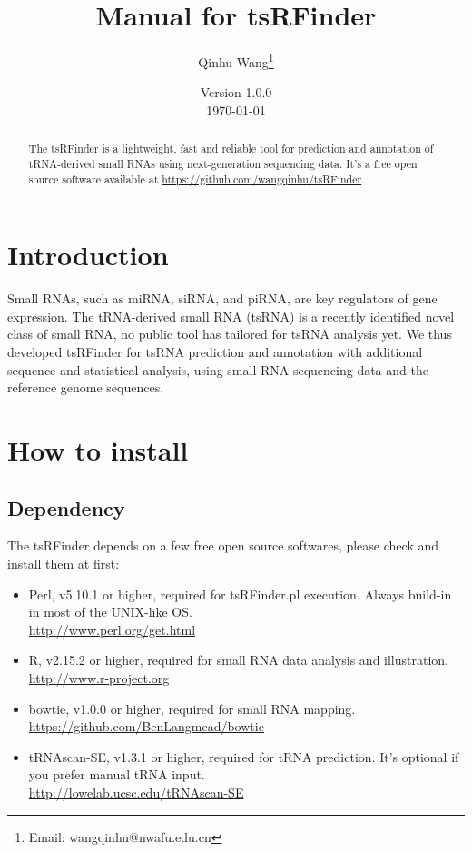 \documentclass[11pt, a4paper]{article}
\title{Manual for tsRFinder}
\author{Qinhu Wang\thanks{Email: wangqinhu@nwafu.edu.cn}}
\affil{Northwest A\&F University}
\date{Version 1.0.0\\[3pt] \today}
\begin{document}
\maketitle

\begin{abstract}
The tsRFinder is a lightweight, fast and reliable tool for prediction and annotation of tRNA-derived small RNAs using next-generation sequencing data. It's a free open source software available at \url{https://github.com/wangqinhu/tsRFinder}.
\end{abstract}

\clearpage

\tableofcontents

\clearpage

\section{Introduction}

Small RNAs, such as miRNA, siRNA, and piRNA, are key regulators of gene expression. The tRNA-derived small RNA (tsRNA) is a recently identified novel class of small RNA, no public tool has tailored for tsRNA analysis yet. We thus developed tsRFinder for tsRNA prediction and annotation with additional sequence and statistical analysis, using small RNA sequencing data and the reference genome sequences.

\section{How to install}

\subsection{Dependency}

The tsRFinder depends on a few free open source softwares, please check and install them at first:

\begin{itemize}

\item Perl, v5.10.1 or higher, required for tsRFinder.pl execution. Always build-in in most of the UNIX-like OS. \\\url{http://www.perl.org/get.html}
\item R, v2.15.2 or higher, required for small RNA data analysis and illustration. \\\url{http://www.r-project.org}
\item bowtie, v1.0.0 or higher, required for small RNA mapping. \\\url{https://github.com/BenLangmead/bowtie}
\item tRNAscan-SE, v1.3.1 or higher, required for tRNA prediction. It's optional if you prefer manual tRNA input. \\\url{http://lowelab.ucsc.edu/tRNAscan-SE}

\end{itemize}
\end{document}
